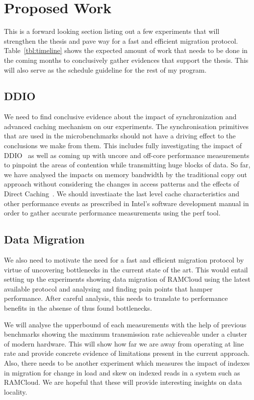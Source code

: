 
\chapter{Proposed Work}
This is a forward looking section listing out a few experiments that will
strengthen the thesis and pave way for a fast and efficient migration protocol.
Table~\ref{tbl:timeline} shows the expected amount of work that needs to be done 
in the coming months to conclusively gather evidences that support the thesis. 
This will also serve as the schedule guideline for the rest of my program.

\section{DDIO}
We need to find conclusive evidence about the impact of synchronization and 
advanced caching mechanism on our experiments. The synchronisation primitives 
that are used in the microbenchmarks should not have a driving effect to the 
conclusions we make from them. This includes fully investigating the impact
of DDIO~\cite{ddio} as well as coming up with uncore and off-core performance
measurements to pinpoint the areas of contention while transmitting huge blocks
of data. So far, we have analysed the impacts on memory bandwidth by the traditional
copy out approach without considering the changes in access patterns and the effects
of Direct Caching~\cite{dca}. We should investiaate the last level cache characteristics 
and other performance events as prescribed in Intel\textregistered 's software development
manual in order to gather accurate performance measurements using the perf tool.

\section{Data Migration}
We also need to motivate the need for a fast and efficient migration protocol 
by virtue of uncovering bottlenecks in the current state of the art. This would entail
setting up the experiments showing data migration of RAMCloud using the latest 
available protocol and analysing and finding pain points that hamper performance.
After careful analysis, this needs to translate to performance benefits in the absense
of thus found bottlenecks. 

We will analyse the upperbound of each measurements with the help
of previous benchmarks showing the maximum transmission rate achieveable under 
a cluster of modern hardware. This will show how far we are away from 
operating at line rate and provide concrete evidence of limitations present in 
the current approach. Also, there needs to be another experiment which measures
the impact of indexes in migration for change in load and skew on indexed reads
in a system such as RAMCloud. We are hopeful that these will provide interesting
insights on data locality.

